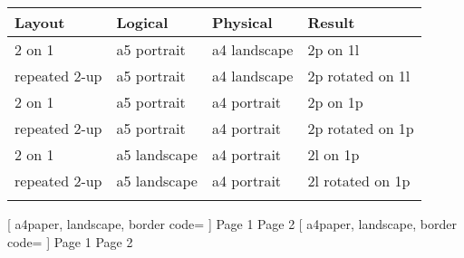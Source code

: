 \documentclass[a5paper]{article}
\begin{document}
\begin{tabular}{llll}
\toprule
Layout & Logical & Physical & Result \\ \midrule
2 on 1 & a5 portrait & a4 landscape & 2p on 1l \\
repeated 2-up & a5 portrait & a4 landscape & 2p rotated on 1l \\
2 on 1 & a5 portrait & a4 portrait & 2p on 1p \\
repeated 2-up & a5 portrait & a4 portrait & 2p rotated on 1p \\
2 on 1 & a5 landscape & a4 portrait & 2l on 1p \\
repeated 2-up & a5 landscape & a4 portrait & 2l rotated on 1p \\
\\\bottomrule
\end{tabular}

\clearpage
{}[
  a4paper,
  landscape,
  border code=
]
Page 1
\clearpage
Page 2
\clearpage
{}[
  a4paper,
  landscape,
  border code=
]
Page 1
\clearpage
Page 2
\end{document}
